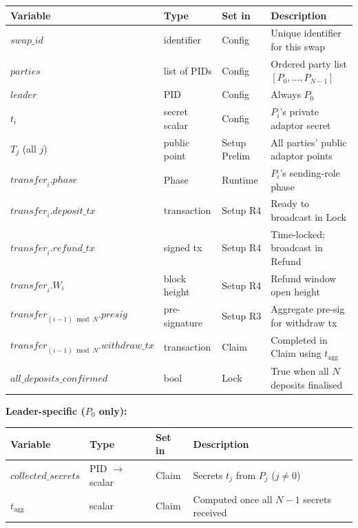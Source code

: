 \documentclass[11pt,a4paper,dvipsnames]{article}
\newcommand{\var}[1]{\mathit{#1}}
\newcommand{\tagg}{t_{\mathrm{agg}}}
\begin{document}
\medskip
\begin{center}
\renewcommand{\arraystretch}{1.25}
\begin{tabular}{@{}llll@{}}
\toprule
\textbf{Variable} & \textbf{Type} & \textbf{Set in} & \textbf{Description} \\
\midrule
$\var{swap\_id}$ & identifier & Config & Unique identifier for this swap \\
$\var{parties}$ & list of PIDs & Config & Ordered party list $[P_0,\ldots,P_{N-1}]$ \\
$\var{leader}$ & PID & Config & Always $P_0$ \\
$t_i$ & secret scalar & Config & $P_i$'s private adaptor secret \\
$T_j$ (all $j$) & public point & Setup Prelim & All parties' public adaptor points \\
\midrule
$\var{transfer}_i.\var{phase}$ & Phase & Runtime & $P_i$'s sending-role phase \\
$\var{transfer}_i.\var{deposit\_tx}$ & transaction & Setup R4 & Ready to broadcast in Lock \\
$\var{transfer}_i.\var{refund\_tx}$ & signed tx & Setup R4 & Time-locked; broadcast in Refund \\
$\var{transfer}_i.W_i$ & block height & Setup R4 & Refund window open height \\
\midrule
$\var{transfer}_{(i-1)\bmod N}.\var{presig}$ & pre-signature & Setup R3 & Aggregate pre-sig for withdraw tx \\
$\var{transfer}_{(i-1)\bmod N}.\var{withdraw\_tx}$ & transaction & Claim & Completed in Claim using $\tagg$ \\
\midrule
$\var{all\_deposits\_confirmed}$ & bool & Lock & True when all $N$ deposits finalised \\
\bottomrule
\end{tabular}
\end{center}

\bigskip\noindent\textbf{Leader-specific ($P_0$ only):}

\begin{center}
\renewcommand{\arraystretch}{1.25}
\begin{tabular}{@{}llll@{}}
\toprule
\textbf{Variable} & \textbf{Type} & \textbf{Set in} & \textbf{Description} \\
\midrule
$\var{collected\_secrets}$ & PID $\to$ scalar & Claim & Secrets $t_j$ from $P_j$ ($j \neq 0$) \\
$\tagg$ & scalar & Claim & Computed once all $N{-}1$ secrets received \\
\bottomrule
\end{tabular}
\end{center}
\end{document}
